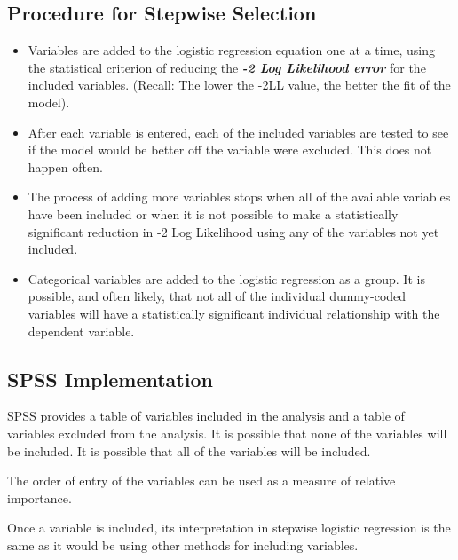 \documentclass[a4paper,12pt]{article}
\begin{document}
\subsection{Procedure for Stepwise Selection}
\begin{itemize}
	\item Variables are added to the logistic regression equation one at a time, using the statistical criterion of reducing the \textbf{\textit{-2 Log Likelihood error}} for the included variables. (Recall: The lower the -2LL value, the better the fit of the model).
	
	\item After each variable is entered, each of the included variables are tested to see if the model would be better off the variable were excluded. This does not happen often.
	
	\item The process of adding more variables stops when all of the available variables have been included or when it is not possible to make a statistically significant reduction in -2 Log Likelihood using any of the variables not yet included.
	
	\item Categorical variables are added to the logistic regression as a group. It is possible, and often likely, that not all of the individual dummy-coded variables will have a statistically significant individual relationship with the dependent variable. 
\end{itemize}

\subsection{SPSS Implementation}
SPSS provides a table of variables included in the analysis and a table of variables excluded from the analysis.  It is possible that none of the variables will be included.  It is possible that all of the variables will be included.

The order of entry of the variables can be used as a measure of relative importance.

Once a variable is included, its interpretation in stepwise logistic regression is the same as it would be using other methods for including variables.
\end{document}
